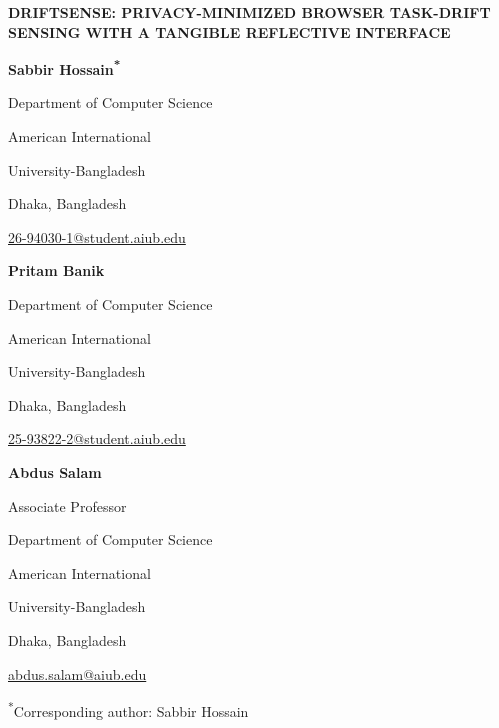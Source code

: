 \documentclass[12pt,a4paper]{article}
\begin{document}
\thispagestyle{plain}

\begin{center}
{\headingfont\bfseries\fontsize{15}{18}\selectfont
DRIFTSENSE: PRIVACY-MINIMIZED BROWSER TASK-DRIFT SENSING WITH A TANGIBLE REFLECTIVE INTERFACE\par}
\vspace{14pt}
\begin{minipage}[t]{0.31\textwidth}
\centering\headingfont
{\bfseries\fontsize{11}{13}\selectfont Sabbir Hossain\textsuperscript{*}\par}
{\fontsize{8.8}{10.5}\selectfont \phantom{Associate Professor}\par}
{\fontsize{9}{10.5}\selectfont Department of Computer Science\par
American International\par
University-Bangladesh\par
Dhaka, Bangladesh\par}
\vspace{2pt}
{\fontsize{8.3}{10}\selectfont \href{mailto:26-94030-1@student.aiub.edu}{26-94030-1@student.aiub.edu}\par}
\end{minipage}\hfill
\begin{minipage}[t]{0.31\textwidth}
\centering\headingfont
{\bfseries\fontsize{11}{13}\selectfont Pritam Banik\par}
{\fontsize{8.8}{10.5}\selectfont \phantom{Associate Professor}\par}
{\fontsize{9}{10.5}\selectfont Department of Computer Science\par
American International\par
University-Bangladesh\par
Dhaka, Bangladesh\par}
\vspace{2pt}
{\fontsize{8.3}{10}\selectfont \href{mailto:25-93822-2@student.aiub.edu}{25-93822-2@student.aiub.edu}\par}
\end{minipage}\hfill
\begin{minipage}[t]{0.31\textwidth}
\centering\headingfont
{\bfseries\fontsize{11}{13}\selectfont Abdus Salam\par}
{\fontsize{8.8}{10.5}\selectfont Associate Professor\par}
{\fontsize{9}{10.5}\selectfont Department of Computer Science\par
American International\par
University-Bangladesh\par
Dhaka, Bangladesh\par}
\vspace{2pt}
{\fontsize{8.3}{10}\selectfont \href{mailto:abdus.salam@aiub.edu}{abdus.salam@aiub.edu}\par}
\end{minipage}
\vspace{5pt}

{\headingfont\fontsize{8.8}{10.5}\selectfont \textsuperscript{*}Corresponding author: Sabbir Hossain\par}
\end{center}
\end{document}
